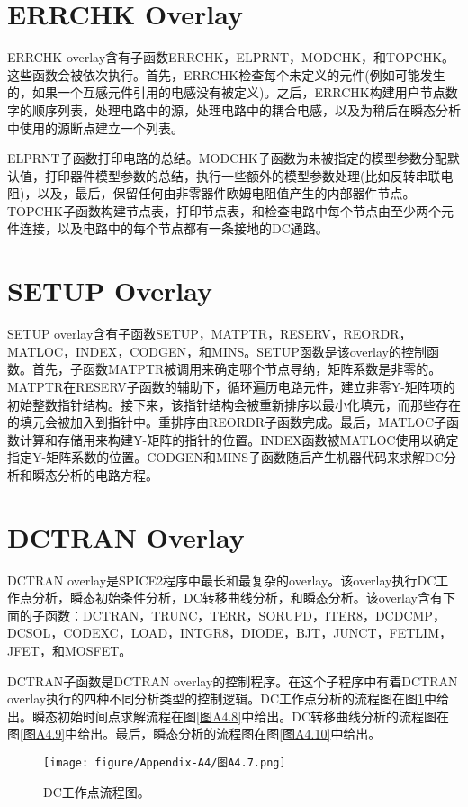 \section{ERRCHK Overlay}
ERRCHK overlay含有子函数ERRCHK，ELPRNT，MODCHK，和TOPCHK。这些函数会被依次执行。首先，ERRCHK检查每个未定义的元件(例如可能发生的，如果一个互感元件引用的电感没有被定义)。之后，ERRCHK构建用户节点数字的顺序列表，处理电路中的源，处理电路中的耦合电感，以及为稍后在瞬态分析中使用的源断点建立一个列表。

ELPRNT子函数打印电路的总结。MODCHK子函数为未被指定的模型参数分配默认值，打印器件模型参数的总结，执行一些额外的模型参数处理(比如反转串联电阻)，以及，最后，保留任何由非零器件欧姆电阻值产生的内部器件节点。TOPCHK子函数构建节点表，打印节点表，和检查电路中每个节点由至少两个元件连接，以及电路中的每个节点都有一条接地的DC通路。

\section{SETUP Overlay}
SETUP overlay含有子函数SETUP，MATPTR，RESERV，REORDR，MATLOC，INDEX，CODGEN，和MINS。SETUP函数是该overlay的控制函数。首先，子函数MATPTR被调用来确定哪个节点导纳，矩阵系数是非零的。MATPTR在RESERV子函数的辅助下，循环遍历电路元件，建立非零Y-矩阵项的初始整数指针结构。接下来，该指针结构会被重新排序以最小化填元，而那些存在的填元会被加入到指针中。重排序由REORDR子函数完成。最后，MATLOC子函数计算和存储用来构建Y-矩阵的指针的位置。INDEX函数被MATLOC使用以确定指定Y-矩阵系数的位置。CODGEN和MINS子函数随后产生机器代码来求解DC分析和瞬态分析的电路方程。

\section{DCTRAN Overlay}
DCTRAN overlay是SPICE2程序中最长和最复杂的overlay。该overlay执行DC工作点分析，瞬态初始条件分析，DC转移曲线分析，和瞬态分析。该overlay含有下面的子函数：DCTRAN，TRUNC，TERR，SORUPD，ITER8，DCDCMP，DCSOL，CODEXC，LOAD，INTGR8，DIODE，BJT，JUNCT，FETLIM，JFET，和MOSFET。

DCTRAN子函数是DCTRAN overlay的控制程序。在这个子程序中有着DCTRAN overlay执行的四种不同分析类型的控制逻辑。DC工作点分析的流程图在图\ref{图A4.7}中给出。瞬态初始时间点求解流程在图\ref{图A4.8}中给出。DC转移曲线分析的流程图在图\ref{图A4.9}中给出。最后，瞬态分析的流程图在图\ref{图A4.10}中给出。

\begin{figure}[htbp]
\small
    \centering
    \texttt{[image: figure/Appendix-A4/图A4.7.png]}
    \caption{DC工作点流程图。}
    \label{图A4.7}
\end{figure}

